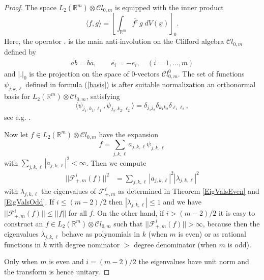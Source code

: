 \documentclass{amsart}
\theoremstyle{remark}
\begin{document}
\begin{proof}
The space $L_{2}(\mathbb{R}^m) \otimes {\mathcal{C}} l_{0,m}$ is equipped with the inner product 
\[
\langle f, g \rangle = \left[ \int_{{\mathbb{R}}^{m}} \overline{f^{c}} \, g \; dV({\underline{x}}) \right]_{0}.
\]
Here, the operator $\bar{.}$ is the main anti-involution on the Clifford algebra ${\mathcal{C}} l_{0,m}$ defined by
\begin{eqnarray*}
\overline{a b} = \overline{b} \overline{a}, \qquad \overline{e_{i}} = -e_{i}, \quad (i = 1,\ldots, m)
\end{eqnarray*}
and $|.|_{0}$ is the projection on the space of $0$-vectors ${\mathcal{C}} l_{0,m}^{0}$. The set of functions $\psi_{j,k,\ell}$ defined in formula (\ref{basis}) is after suitable normalization an orthonormal basis for $L_{2}(\mathbb{R}^m) \otimes {\mathcal{C}} l_{0,m}$, satisfying
\[
\langle \psi_{j_{1},k_{1}, \ell_{1}} , \psi_{j_{2},k_{2}, \ell_{2}} \rangle = \delta_{j_{1} j_{2}} \delta_{k_{1} k_{2}}\delta_{\ell_{1} \ell_{2}}, 
\]
see e.g. \cite{MR926831}. 

Now let $f \in L_{2}(\mathbb{R}^m) \otimes {\mathcal{C}} l_{0,m}$ have the expansion
\[
f = \sum_{j,k,\ell} a_{j,k,\ell} \psi_{j,k,\ell}
\]
with $\sum_{j,k,\ell} |a_{j,k,\ell}|^{2} < \infty$. Then we compute
\begin{align*}
||\mathcal{F}^{i}_{+,m} (f) ||^{2} &= \sum_{j,k,\ell} |a_{j,k,\ell}|^{2} |{{\lambda}}_{j,k,\ell}|^{2}
\end{align*}
with ${{\lambda}}_{j,k,\ell}$ the eigenvalues of $\mathcal{F}^{i}_{+,m}$ as determined in Theorem \ref{EigValsEven} and \ref{EigValsOdd}.
If $i \leq (m-2)/2$ then $|{{\lambda}}_{j,k,\ell}| \leq 1$ and we have $||\mathcal{F}^{i}_{+,m} (f) || \leq ||f||$ for all $f$. On the other hand, if $i > (m-2)/2$ it is easy to construct an $f \in L_{2}(\mathbb{R}^m) \otimes {\mathcal{C}} l_{0,m}$ such that $||\mathcal{F}^{i}_{+,m} (f) || >  \infty$, because then the eigenvalues ${{\lambda}}_{j,k,\ell}$ behave as polynomials in $k$ (when $m$ is even) or as rational functions in $k$ with degree nominator $>$ degree denominator (when $m$ is odd). 

Only when $m$ is even and $i = (m-2)/2$ the eigenvalues have unit norm and the transform is hence unitary.
\end{proof}
\end{document}

